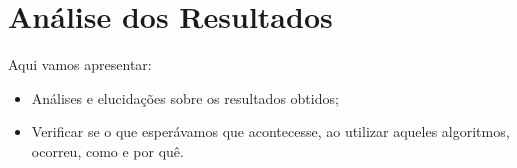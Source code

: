 \chapter{\label{chap:analysis}Análise dos Resultados}

Aqui vamos apresentar:

\begin{itemize}
\item Análises e elucidações sobre os resultados obtidos;
\item Verificar se o que esperávamos que acontecesse, ao utilizar aqueles algoritmos, ocorreu, como e por quê.
\end{itemize}